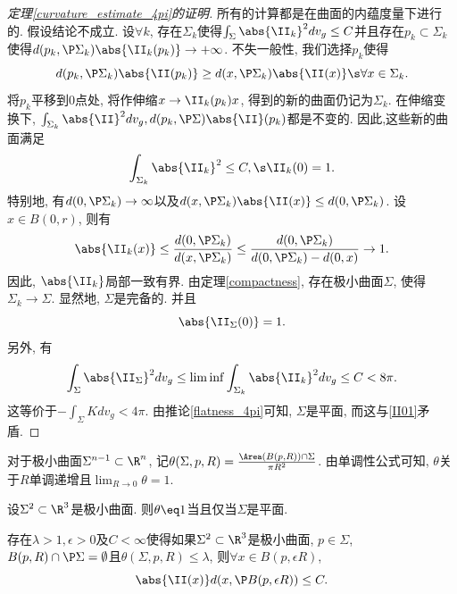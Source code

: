 \begin{proof}[定理\eqref{curvature_estimate_4pi}的证明]
    所有的计算都是在曲面的内蕴度量下进行的. 假设结论不成立. 设$\forall k$, 存在$\Sigma_k$使得$\int_\Sigma \abs{\II_k}^2dv_g \le C$并且存在$p_k \subset \Sigma_k$使得$d(p_k,\P \Sigma_k)\abs{\II_k(p_k)} \to +\infty$. 不失一般性, 我们选择$p_k$使得
    \begin{equation}
        d(p_k, \P \Sigma_k)\abs{\II(p_k)} \ge d(x,\P \Sigma_k)\abs{\II(x)} \s \forall x \in \Sigma_k.
    \end{equation}
    将$p_k$平移到0点处, 将作伸缩$x \to \II_k(p_k)x$, 得到的新的曲面仍记为$\Sigma_k$. 在伸缩变换下,  $\int_{\Sigma_k}\abs{\II}^2dv_g, d(p_k,\P \Sigma)\abs{\II}(p_k)$都是不变的.  因此,这些新的曲面满足
    \begin{equation} \label{iikk0}
        \int_{\Sigma_k} \abs{\II_k}^2 \le C, \s \II_k(0) =1.
    \end{equation}
    特别地, 有$d(0,\P \Sigma_k) \to \infty$以及$d(x,\P \Sigma_k) \abs{\II(x)} \le d(0,\P \Sigma_k)$. 设$x \in B(0,r)$, 则有
    \begin{equation}
        \abs{\II_k(x)} \le \frac{d(0,\P \Sigma_k)}{d(x,\P \Sigma_k)} \le \frac{d(0,\P \Sigma_k)}{d(0,\P \Sigma_k) - d(0,x)} \to 1.
    \end{equation}
    因此, $\abs{\II_k}$局部一致有界. 由定理\eqref{compactness}, 存在极小曲面$\Sigma$, 使得$\Sigma_k \to \Sigma$. 显然地, $\Sigma$是完备的.  并且
    \begin{equation} \label{II01}
        \abs{\II_\Sigma(0)}=1.
    \end{equation}
    另外, 有
    \begin{equation}
        \int_\Sigma \abs{\II_\Sigma}^2dv_g \le \liminf \int_{\Sigma_k} \abs{\II_k}^2dv_g \le C < 8\pi.
    \end{equation}
    这等价于$-\int_\Sigma K dv_g < 4\pi$. 由推论\eqref{flatness_4pi}可知, $\Sigma$是平面, 而这与\eqref{II01}矛盾.
\end{proof}
对于极小曲面$\Sigma^{n-1} \subset \R^n$, 记$\theta(\Sigma,p,R)=\frac{\Area(B(p,R))\cap \Sigma}{\pi R^2}$. 由单调性公式可知, $\theta$关于$R$单调递增且$\mathop{\lim}_{R\to 0} \theta=1$.
\begin{lemma}\label{theta_flat}
    设$\Sigma^{2}\subset \R^3$是极小曲面. 则$\theta \eq 1$当且仅当$\Sigma$是平面.
\end{lemma}
\begin{theorem}
    存在$\lambda >1, \epsilon>0$及$C< \infty$使得如果$\Sigma^2\subset \R^3$是极小曲面, $p\in \Sigma$, $B(p,R) \cap \P \Sigma = \emptyset$且$\theta(\Sigma, p, R) \le \lambda$, 则$\forall x\in  B(p, \epsilon R)$,
    \begin{equation}
        \abs{\II(x)}d(x,\P B(p,\epsilon R)) \le C.
    \end{equation}
\end{theorem}
